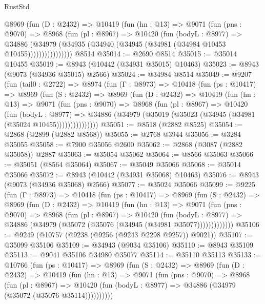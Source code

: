 \begin{lexlean}{RustStd}
\begin{coremodule}
{\begin{coremodule}
{{{{{{{{{{{{{{{{{{{{{{{{{{{{{{{{{{{{{{{            @8969
              (fun (D : @2432) =>
              @10419
                (fun (hn : @13) =>
                @9071
                  (fun (pns : @9070) =>
                  @8968
                    (fun (pl : @8967) =>
                    @10420
                      (fun (bodyL : @8977) =>
                      @34886
                        (@34979
                          (@34935 (@34940 (@34945 (@34981 (@34984 @10453 @10455))))))))))))))))
    @8514
@35014 := @2690 @8514
@35015 := @35014 @10455
@35019 := @8943 (@10442 (@34931 @35015) @10463)
@35023 := @8943 (@9073 (@34936 @35015) @2566)
@35024 := @34984 @8514
@35049 := @9207
    (fun (tail0 : @2722) =>
    @8974
      (fun (Γ : @8973) =>
      @10418
        (fun (ps : @10417) =>
        @8969
          (fun (S : @2432) =>
          @8969
            (fun (D : @2432) =>
            @10419
              (fun (hn : @13) =>
              @9071
                (fun (pns : @9070) =>
                @8968
                  (fun (pl : @8967) =>
                  @10420
                    (fun (bodyL : @8977) =>
                    @34886 (@34979 (@35019 (@35023 (@34945 (@34981 (@35024 @10455)))))))))))))))
@35051 := @8518 (@2882 @8525)
@35054 := @2868 (@2899 (@2882 @8568))
@35055 := @2768 @3944
@35056 := @3284 @35055
@35058 := @7900 @35056 @2600
@35062 := @2868 (@3087 (@2882 @35058)) @2887
@35063 := @35054 @35062
@35064 := @8566 @35063
@35066 := @35051 (@8564 @35064)
@35067 := @35049 @35066
@35068 := @35014 @35066
@35072 := @8943 (@10442 (@34931 @35068) @10463)
@35076 := @8943 (@9073 (@34936 @35068) @2566)
@35077 := @35024 @35066
@35099 := @9225
    (fun (Γ : @8973) =>
    @10418
      (fun (ps : @10417) =>
      @8969
        (fun (S : @2432) =>
        @8969
          (fun (D : @2432) =>
          @10419
            (fun (hn : @13) =>
            @9071
              (fun (pns : @9070) =>
              @8968
                (fun (pl : @8967) =>
                @10420
                  (fun (bodyL : @8977) =>
                  @34886 (@34979 (@35072 (@35076 (@34945 (@34981 @35077)))))))))))))
@35106 := @9249 (@10757 (@9238 (@9256 (@9243 @2298 @9257)) @9021))
@35107 := @35099 @35106
@35109 := @34943 (@9034 @35106)
@35110 := @8943 @35109
@35113 := @9041 @35106 @34980 @35077
@35114 := @35110 @35113
@35133 := @10766
    (fun (ps : @10417) =>
    @8969
      (fun (S : @2432) =>
      @8969
        (fun (D : @2432) =>
        @10419
          (fun (hn : @13) =>
          @9071
            (fun (pns : @9070) =>
            @8968
              (fun (pl : @8967) =>
              @10420 (fun (bodyL : @8977) => @34886 (@34979 (@35072 (@35076 @35114))))))))))
}}}}}}}}}}}}}}}}}}}}}}}}}}}}}}}}}}}}}}}
\end{coremodule}}
\end{coremodule}
\end{lexlean}
